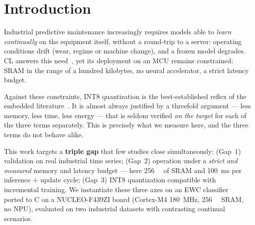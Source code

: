 \section{Introduction}
\label{sec:intro}

Industrial predictive maintenance increasingly requires models able to \emph{learn continually} on the
equipment itself, without a round-trip to a server: operating conditions drift (wear, regime or machine
change), and a frozen model degrades. \gls{CL} answers this
need~\cite{DeLange2021Survey,Hurtado2023CLPdM}, yet its deployment on an \gls{MCU} remains
constrained: \gls{SRAM} in the range of a hundred kilobytes, no neural accelerator, a strict latency budget.

Against these constraints, INT8 quantization is the best-established reflex of the embedded
literature~\cite{Ravaglia2021QLRCL,Capogrosso2023TinyML}. It is almost always justified by a threefold
argument --- less memory, less time, less energy --- that is seldom verified \emph{on the target} for each
of the three terms separately. This is precisely what we measure here, and the three terms do not behave
alike.

This work targets a \textbf{triple gap} that few studies close simultaneously: (Gap~1) validation on real
industrial time series; (Gap~2) operation under a \emph{strict and measured} memory and latency budget ---
here \SI{256}{\kilo\byte} of SRAM and \SI{100}{\milli\second} per inference + update cycle; (Gap~3) INT8
quantization compatible with incremental training. We instantiate these three axes on an \gls{EWC}
classifier~\cite{Kirkpatrick2017EWC} ported to C on a NUCLEO-F439ZI board (Cortex-M4
\SI{180}{\mega\hertz}, \SI{256}{\kilo\byte} SRAM, no \gls{NPU}), evaluated on two industrial datasets with
contrasting continual scenarios.

